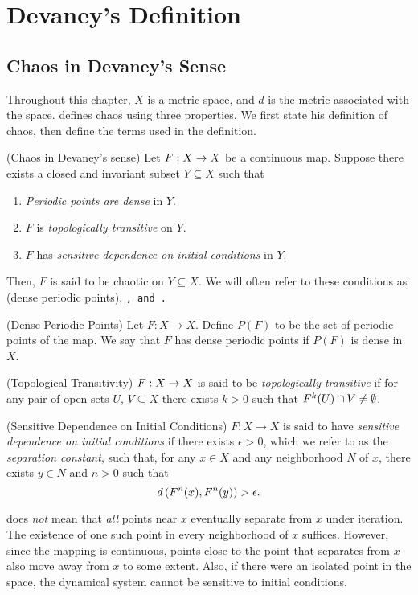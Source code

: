 \documentclass[10pt,draft,twoside]{book}
\begin{document}
\chapter{Devaney's Definition}
\label{chap:devaney}
\section{Chaos in Devaney's Sense}
Throughout this chapter, $X$ is a metric space, and $d$ is the metric associated with the space.
\citet{devaney} defines chaos using three properties.
We first state his definition of chaos, then define the terms used in the definition.
\begin{definition}
  (Chaos in Devaney's sense) 
  Let $F: X\rightarrow X$ be a continuous map.
  Suppose there exists a closed and invariant subset $Y \subseteq X$ such that
  \begin{enumerate}
    \item \textit{Periodic points are dense} in $Y$.
    \item $F$ is \textit{topologically transitive} on $Y$.
    \item $F$ has \textit{sensitive dependence on initial conditions} in $Y$.
  \end{enumerate}
  Then, $F$ is said to be chaotic on $Y \subseteq X$.
  We will often refer to these conditions as \dpp (dense periodic points), \tt, and \sdic.
\end{definition}
%
\begin{definition}
  (Dense Periodic Points) 
  Let $F: X \to X$.
  Define $P(F)$ to be the set of periodic points of the map.
  We say that $F$ has dense periodic points if $P(F)$ is dense in $X$.
\end{definition}
%
\begin{definition}
  (Topological Transitivity) 
  $F: X \rightarrow X$ is said to be \textit{topologically transitive} if for any pair of open sets $U$, $V \subseteq X$ there exists $k > 0$ such that $F^{k}(U) \cap V \neq \emptyset$.
  \label{defn:transitivity}
   \end{definition}
%
\begin{definition}
  (Sensitive Dependence on Initial Conditions) 
  $F: X \rightarrow X$ is said to have \textit{sensitive dependence on initial conditions} if there exists $\epsilon > 0$, which we refer to as the \textit{separation constant}, such that, for any $x \in X$ and any neighborhood $N$ of $x$, there exists $y\in N$ and $n > 0$ such that 
  \begin{equation*}
    d\left( F^{n}(x), F^{n}(y) \right) > \epsilon.
  \end{equation*}
  \label{defn:sdic}
\end{definition}
%
\sdic does \textit{not} mean that \textit{all} points near $x$ eventually separate from $x$ under iteration.
The existence of one such point in every neighborhood of $x$ suffices.
However, since the mapping is continuous, points close to the point that separates from $x$ also move away from $x$ to some extent.
Also, if there were an isolated point in the space, the dynamical system cannot be sensitive to initial conditions.
\end{document}
